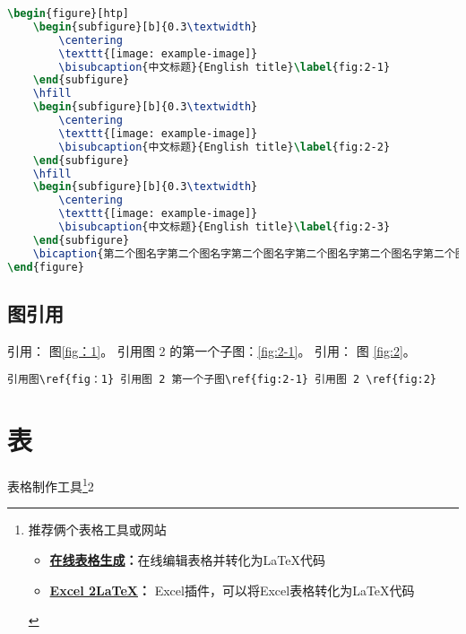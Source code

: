 \begin{lstlisting}[language=TeX]
\begin{figure}[htp]
	\begin{subfigure}[b]{0.3\textwidth}
		\centering
		\texttt{[image: example-image]}
		\bisubcaption{中文标题}{English title}\label{fig:2-1}
	\end{subfigure}
	\hfill
	\begin{subfigure}[b]{0.3\textwidth}
		\centering
		\texttt{[image: example-image]}
		\bisubcaption{中文标题}{English title}\label{fig:2-2}
	\end{subfigure}
	\hfill
	\begin{subfigure}[b]{0.3\textwidth}
		\centering
		\texttt{[image: example-image]}
		\bisubcaption{中文标题}{English title}\label{fig:2-3}
	\end{subfigure}
	\bicaption{第二个图名字第二个图名字第二个图名字第二个图名字第二个图名字第二个图名字第二个图名字第二个图名字第二个图名字第二个图名字}{English title}\label{fig:2}
\end{figure}
\end{lstlisting}

\subsection{图引用}
引用： 图\ref{fig：1}。 引用图 2 的第一个子图：\ref{fig:2-1}。 引用： 图 \ref{fig:2}。
\begin{lstlisting}
引用图\ref{fig：1} 引用图 2 第一个子图\ref{fig:2-1} 引用图 2 \ref{fig:2}
\end{lstlisting}
\section{表}
表格制作工具\footnote{推荐俩个表格工具或网站\begin{itemize}
		\item \textbf{\href{www.tablesgenerator.com}{在线表格生成}\;：}在线编辑表格并转化为\LaTeX 代码
		\item \textbf{\href{https://www.ctan.org/tex-archive/support/excel2latex/}{Excel 2\LaTeX}\;：
		}Excel插件，可以将Excel表格转化为\LaTeX 代码
\end{itemize}}2
